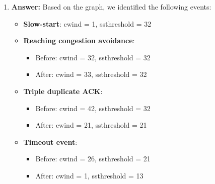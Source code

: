 \documentclass[12pt]{article}
\begin{document}
\begin{enumerate}
\item{} \textbf{Answer:}
Based on the graph, we identified the following events:\\
\begin{itemize}
\item \textbf{Slow-start}: cwind = 1, ssthreshold = 32
\item \textbf{Reaching congestion avoidance}: 
\begin{itemize}
\item Before: cwind = 32, ssthreshold = 32
\item After: cwind = 33, ssthreshold = 32
\end{itemize}
\item \textbf{Triple duplicate ACK}:
\begin{itemize}
\item Before: cwind = 42, ssthreshold = 32
\item After: cwind = 21, ssthreshold = 21
\end{itemize}
\item \textbf{Timeout event}:
\begin{itemize}
\item Before: cwind = 26, ssthreshold = 21
\item After: cwind = 1, ssthreshold = 13
\end{itemize}
\end{itemize}


\end{enumerate}
\end{document}
